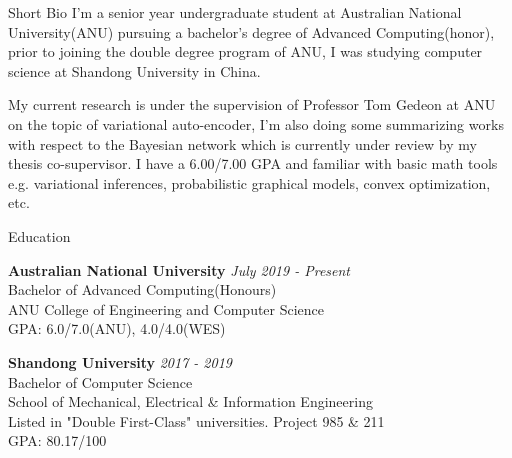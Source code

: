 \documentclass{resume} %
\begin{document}
\begin{rSection}{Short Bio}
I’m a senior year undergraduate student at Australian National University(ANU) pursuing a bachelor's degree of Advanced Computing(honor), prior to joining the double degree program of ANU, I was studying computer science at Shandong University in China.

My current research is under the supervision of Professor Tom Gedeon at ANU on the topic of variational auto-encoder, I’m also doing some summarizing works with respect to the Bayesian network which is currently under review by my thesis co-supervisor. I have a 6.00/7.00 GPA and familiar with basic math tools e.g. variational inferences, probabilistic graphical models, convex optimization, etc.
\end{rSection}

\begin{rSection}{Education}

{\bf Australian National University} \hfill {\em July 2019 - Present} 
\\ Bachelor of Advanced Computing(Honours)
\\ ANU College of Engineering and Computer Science
\\ { GPA: 6.0/7.0(ANU), 4.0/4.0(WES) }
 
 {\bf Shandong University} \hfill {\em 2017 - 2019} 
\\ Bachelor of Computer Science
\\ School of Mechanical, Electrical \& Information Engineering
\\ Listed in "Double First-Class" universities. Project 985 \& 211
\\ { GPA: 80.17/100}


\end{rSection}
\end{document}
